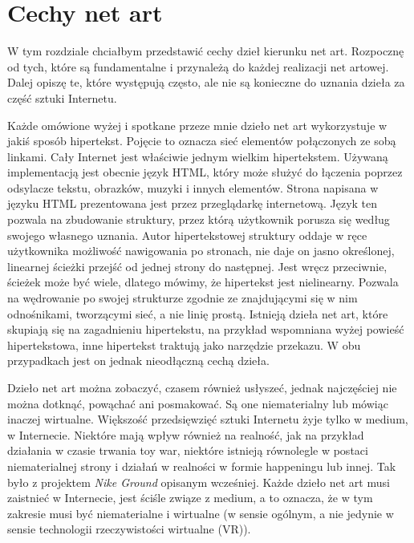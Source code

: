 \documentclass[a4paper,12pt,twoside]{article}
\begin{document}
\section{Cechy net art}
W tym rozdziale chciałbym przedstawić cechy dzieł kierunku net art.
Rozpocznę od tych, które są fundamentalne i przynależą do każdej
realizacji net artowej. Dalej opiszę te, które występują często,
ale nie są konieczne do uznania dzieła za część sztuki Internetu.

Każde omówione wyżej i spotkane przeze mnie dzieło net art wykorzystuje
w jakiś sposób hipertekst. Pojęcie to oznacza sieć elementów
połączonych ze sobą linkami. Cały Internet jest właściwie jednym
wielkim hipertekstem. Używaną implementacją jest obecnie język
HTML, który może służyć do łączenia poprzez odsylacze tekstu, obrazków,
muzyki i innych elementów. Strona napisana w języku HTML prezentowana
jest przez przeglądarkę internetową. Język ten pozwala na zbudowanie
struktury, przez którą użytkownik porusza się według swojego własnego
uznania. Autor hipertekstowej struktury oddaje w ręce użytkownika
możliwość nawigowania po stronach, nie daje on jasno określonej,
linearnej ścieżki przejść od jednej strony do następnej. Jest wręcz
przeciwnie, ścieżek może być wiele, dlatego mówimy, że hipertekst
jest nielinearny. Pozwala na wędrowanie po swojej strukturze zgodnie
ze znajdującymi się w nim odnośnikami, tworzącymi sieć, a nie linię
prostą. Istnieją dzieła net art, które skupiają się na zagadnieniu
hipertekstu, na przykład wspomniana wyżej powieść hipertekstowa,
inne hipertekst traktują jako narzędzie przekazu. W obu przypadkach
jest on jednak nieodłączną cechą dzieła.

Dzieło net art można zobaczyć, czasem również usłyszeć, jednak najczęściej
nie można dotknąć, powąchać ani posmakować. Są one niematerialny
lub mówiąc inaczej wirtualne. Większość przedsięwzięć sztuki Internetu
żyje tylko w medium, w Internecie. Niektóre mają wpływ również na
realność, jak na przykład działania w czasie trwania toy war, niektóre
istnieją równolegle w postaci niematerialnej strony i działań w realności
w formie happeningu lub innej. Tak było z projektem \textit{Nike Ground}
opisanym wcześniej. Każde dzieło net art musi zaistnieć w Internecie,
jest ściśle związe z medium, a to oznacza, że w tym zakresie musi
być niematerialne i wirtualne (w sensie ogólnym, a nie jedynie w sensie
technologii rzeczywistości wirtualne (VR)).
\end{document}
